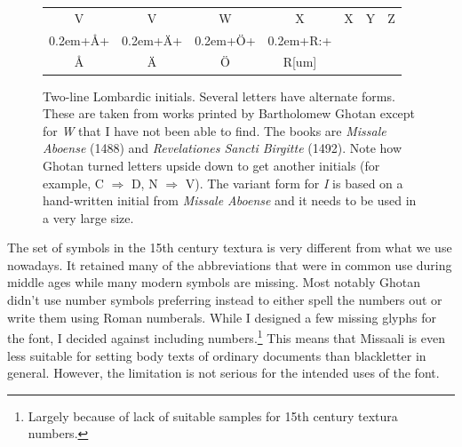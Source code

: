 \documentclass[a4paper, 12pt]{article}
\newcommand{\initsample}[1]{{\initsamplefont #1}}
\newcommand{\initsamplefont}{\fontsize{36}{36}\fontspec{Missaali}\spaceskip0.2em}
\begin{document}
\begin{figure}
{\begin{tabular}{ccccccc}
V & V & W & X & X & Y & Z  \\

\initsample{+Å+} &
\initsample{+Ä+} & 
\initsample{+Ö+} & 
\initsample{+R:+} \\

Å & Ä & Ö & R[um] \\
  \end{tabular}}

\caption{Two-line Lombardic initials. Several letters have alternate
  forms. These are taken from works printed by Bartholomew Ghotan
  except for \emph{W} that I have not been able to find. The books are
  \emph{Missale Aboense} (1488) and \emph{Revelationes Sancti
    Birgitte} (1492). Note how Ghotan turned letters upside down to
  get another initials (for example, C $\Rightarrow$ D, N
  $\Rightarrow$ V). The variant form for \emph{I} is based on a
  hand-written initial from \emph{Missale Aboense} and it needs to be
  used in a very large size.}
  \label{fig:lombardic_initials}
\end{figure}

The set of symbols in the 15th century textura is very different from
what we use nowadays. It retained many of the abbreviations that were
in common use during middle ages while many modern symbols are
missing. Most notably Ghotan didn't use number symbols preferring
instead to either spell the numbers out or write them using Roman
numberals. While I designed a few missing glyphs for the font, I
decided against including numbers.\footnote{Largely because of lack of
  suitable samples for 15th century textura numbers.} This means that
Missaali is even less suitable for setting body texts of ordinary
documents than blackletter in general. However, the limitation is not
serious for the intended uses of the font.
\end{document}

